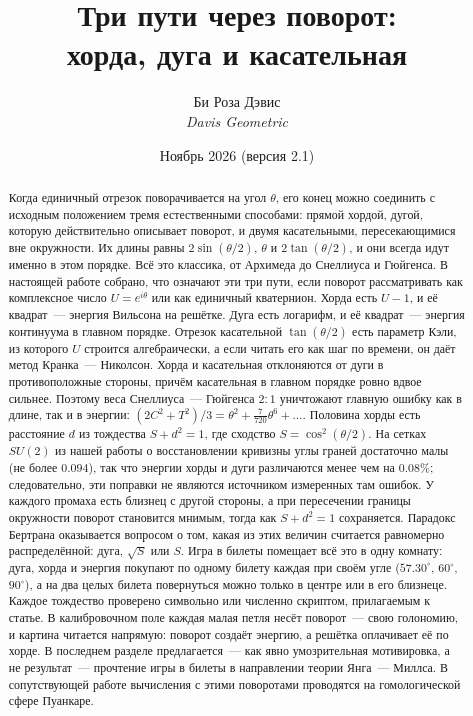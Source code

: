\title{Три пути через поворот:\\ хорда, дуга и касательная}
\author{Би Роза Дэвис\\[1pt] {\normalsize\upshape\itshape Davis Geometric}}
\date{Ноябрь 2026 (версия 2.1)}


\maketitle

\begin{abstract}
Когда единичный отрезок поворачивается на угол $\theta$, его конец можно соединить с
исходным положением тремя естественными способами: прямой хордой, дугой, которую
действительно описывает поворот, и двумя касательными, пересекающимися вне окружности.
Их длины равны $2\sin(\theta/2)$, $\theta$ и $2\tan(\theta/2)$, и они всегда идут именно в
этом порядке. Всё это классика, от Архимеда до Снеллиуса и Гюйгенса. В настоящей работе
собрано, что означают эти три пути, если поворот рассматривать как комплексное число
$U=e^{i\theta}$ или как единичный кватернион. Хорда есть $U-1$, и её квадрат~--- энергия
Вильсона на решётке. Дуга есть логарифм, и её квадрат~--- энергия континуума в главном порядке. Отрезок
касательной $\tan(\theta/2)$ есть параметр Кэли, из которого $U$ строится алгебраически, а
если читать его как шаг по времени, он даёт метод Кранка~--- Николсон. Хорда и касательная
отклоняются от дуги в противоположные стороны, причём касательная в главном порядке ровно
вдвое сильнее. Поэтому веса Снеллиуса~--- Гюйгенса
$2{:}1$ уничтожают главную ошибку как в длине, так и в энергии: $(2C^2+T^2)/3=\theta^2+
\tfrac{7}{720}\theta^6+\dots$. Половина хорды есть расстояние $d$ из тождества $S+d^2=1$,
где сходство $S=\cos^2(\theta/2)$. На сетках $SU(2)$ из нашей работы о восстановлении
кривизны углы граней достаточно малы (не более $0.094$), так что энергии хорды и дуги
различаются менее чем на $0.08\%$; следовательно, эти поправки не являются источником
измеренных там ошибок.
У каждого промаха есть близнец с другой стороны, а при пересечении границы окружности
поворот становится мнимым, тогда как $S+d^2=1$ сохраняется. Парадокс Бертрана оказывается
вопросом о том, какая из этих величин считается равномерно распределённой: дуга, $\sqrt S$ или $S$.
Игра в билеты помещает всё это в одну комнату: дуга, хорда и энергия покупают по одному билету каждая при своём угле ($57.30^\circ$, $60^\circ$, $90^\circ$), а на два целых билета повернуться можно только в центре или в его близнеце.
Каждое тождество проверено символьно или численно скриптом, прилагаемым к статье.
В калибровочном поле каждая малая петля несёт поворот~--- свою голономию, и картина
читается напрямую: поворот создаёт энергию, а решётка оплачивает её по хорде. В последнем разделе
предлагается~--- как явно умозрительная мотивировка, а не результат~--- прочтение игры в билеты
в направлении теории Янга~--- Миллса. В сопутствующей работе
вычисления с этими поворотами проводятся на гомологической сфере Пуанкаре.
\end{abstract}

